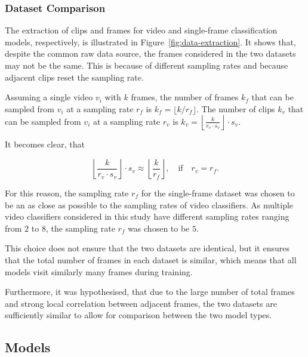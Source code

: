 \documentclass[a4paper]{article}
\begin{document}
\subsubsection{Dataset Comparison} %

The extraction of clips and frames for video and single-frame classification
models, respectively, is illustrated in Figure~\ref{fig:data-extraction}. It
shows that, despite the common raw data source, the frames considered in the two
datasets may not be the same. This is because of different sampling rates and
because adjacent clips reset the sampling rate. 

Assuming a single video $v_i$ with $k$ frames, the number of frames $k_f$ that
can be sampled from $v_i$ at a sampling rate $r_f$ is $k_f = \lfloor k / r_f
\rfloor$. The number of clips $k_v$ that can be sampled from $v_i$ at a sampling
rate $r_v$ is $k_v = \left\lfloor \frac{k}{r_v \cdot s_v} \right\rfloor \cdot
s_v$. 

It becomes clear, that


\[
  \left\lfloor \frac{k}{r_v \cdot s_v} \right\rfloor \cdot s_v \approx
  \left\lfloor \frac{k}{r_f} \right\rfloor, \quad \text{if} \quad r_v = r_f.
\]

For this reason, the sampling rate $r_f$ for the single-frame dataset was chosen
to be an as close as possible to the sampling rates of video classifiers. As
multiple video classifiers considered in this study have different sampling
rates ranging from $2$ to $8$, the sampling rate $r_f$ was chosen to be $5$.

This choice does not ensure that the two datasets are identical, but it ensures
that the total number of frames in each dataset is similar, which means that
all models visit similarly many frames during training.

Furthermore, it was hypothesised, that due to the large number of total frames
and strong local correlation between adjacent frames, the two datasets are
sufficiently similar to allow for comparison between the two model types.



\subsection{Models} %
\label{sub:models}
\end{document}
